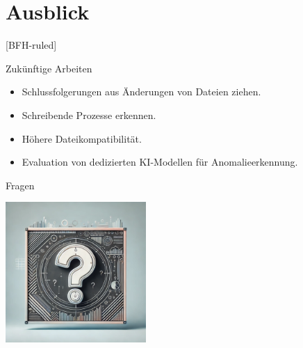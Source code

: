 \documentclass[
    ngerman,%
    authorontitle=true,
]{bfhbeamer}
\begin{document}
    \section{Ausblick}\label{sec:ausblick}
    [BFH-ruled]
    \frame{\sectionpage}

    \begin{frame}{Zukünftige Arbeiten}
        \begin{itemize}
            \item Schlussfolgerungen aus Änderungen von Dateien ziehen.
            \item Schreibende Prozesse erkennen.
            \item Höhere Dateikompatibilität.
            \item Evaluation von dedizierten KI-Modellen für Anomalieerkennung.
        \end{itemize}
    \end{frame}

    \begin{frame}{Fragen}
        \begin{center}
            \includegraphics[width=0.4\textwidth]{assets/presentation/questions_frame_image}
        \end{center}
    \end{frame}
\end{document}
